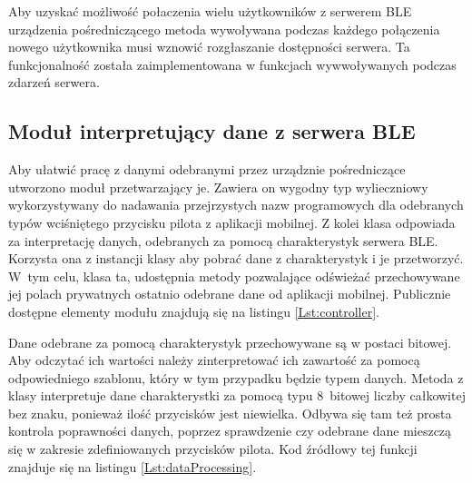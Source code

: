 \documentclass[12pt,twoside]{article}
\begin{document}


Aby uzyskać możliwość połaczenia wielu użytkowników z serwerem BLE urządzenia pośredniczącego metoda wywoływana podczas każdego połączenia nowego użytkownika musi wznowić rozgłaszanie dostępności serwera. Ta funkcjonalność została zaimplementowana w funkcjach wywwoływanych podczas zdarzeń serwera.
\subsection{Moduł interpretujący dane z serwera BLE}
Aby ułatwić pracę z danymi odebranymi przez urządznie pośredniczące utworzono moduł przetwarzający je. Zawiera on wygodny typ wylieczniowy wykorzystywany do nadawania przejrzystych nazw programowych dla odebranych typów wciśniętego przycisku pilota z aplikacji mobilnej.
Z kolei klasa  odpowiada za interpretację danych, odebranych za pomocą charakterystyk serwera BLE. Korzysta ona z instancji klasy  aby pobrać dane z charakterystyk i je przetworzyć. W~tym celu, klasa ta, udostępnia metody pozwalające odświeżać przechowywane jej polach prywatnych ostatnio odebrane dane od aplikacji mobilnej. Publicznie dostępne elementy modułu znajdują się na listingu \ref*{Lst:controller}.
\vfill



Dane odebrane za pomocą charakterystyk przechowywane są w postaci bitowej. Aby odczytać ich wartości należy zinterpretować ich zawartość za pomocą odpowiedniego szablonu, który w tym przypadku będzie typem danych. Metoda  z klasy  interpretuje dane charakterystki za pomocą typu 8~bitowej liczby całkowitej bez znaku, ponieważ ilość przycisków jest niewielka. Odbywa się tam też prosta kontrola poprawności danych, poprzez sprawdzenie czy odebrane dane mieszczą się w zakresie zdefiniowanych przycisków pilota. Kod źródłowy tej funkcji znajduje się na listingu \ref*{Lst:dataProcessing}.


\end{document}
